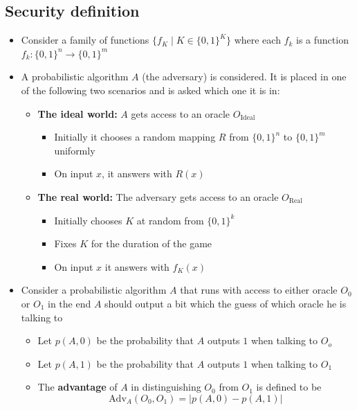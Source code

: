 \subsection{Security definition}
\begin{itemize}
  \item Consider a family of functions $\{f_K \mid K \in \{0,1\}^K\}$ where each $f_k$ is a function $f_k : \{0,1\}^n \to \{0,1\}^m$
  \item A probabilistic algorithm $A$ (the adversary) is considered. It is placed in one of the following two scenarios and is asked which one it is in:
  \begin{itemize}
  	\item \textbf{The ideal world:} $A$ gets access to an oracle $O_{\text{Ideal}}$
    \begin{itemize}
  		\item Initially it chooses a random mapping $R$ from $\{0,1\}^n$ to $\{0,1\}^m$ uniformly
  		\item On input $x$, it answers with $R(x)$
    \end{itemize}
  	\item \textbf{The real world:} The adversary gets access to an oracle $O_\text{Real}$
    \begin{itemize}
  		\item Initially chooses $K$ at random from $\{0,1\}^k$
  		\item Fixes $K$ for the duration of the game
  		\item On input $x$ it answers with $f_K(x)$
    \end{itemize}
  \end{itemize}
  \item Consider a probabilistic algorithm $A$ that runs with access to either oracle $O_0$ or $O_1$ in the end $A$ should output a bit which the guess of which oracle he is talking to
  \begin{itemize}
  	\item Let $p(A,0)$ be the probability that $A$ outputs $1$ when talking to $O_o$
  	\item Let $p(A,1)$ be the probability that $A$ outputs $1$ when talking to $O_1$
  	\item The \textbf{advantage} of $A$ in distinguishing $O_0$ from $O_1$ is defined to be
    \begin{equation*}
      \text{Adv}_A(O_0,O_1) = |p(A,0) - p(A,1)|
    \end{equation*}
    \begin{itemize}

\end{itemize}
\end{itemize}
\end{itemize}
